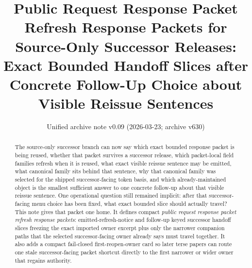 \documentclass[11pt]{article}
\title{Public Request Response Packet Refresh Response Packets for Source-Only Successor Releases:\\[0.5ex]
\large Exact Bounded Handoff Slices after Concrete Follow-Up Choice about Visible Reissue Sentences}
\author{}
\date{Unified archive note v0.09 (2026-03-23; archive v630)}
\begin{document}
\maketitle

\begin{abstract}
The source-only successor branch can now say which exact bounded response packet is being reused, whether that packet survives a successor release, which packet-local field families refresh when it is reused, what exact visible reissue sentence may be emitted, what canonical family sits behind that sentence, why that canonical family was selected for the shipped successor-facing token basis, and which already-maintained object is the smallest sufficient answer to one concrete follow-up about that visible reissue sentence. One operational question still remained implicit: after that successor-facing menu choice has been fixed, what exact bounded slice should actually travel? This note gives that packet one home. It defines compact \emph{public request response packet refresh response packets}: emitted-refresh-notice and follow-up keyed successor handoff slices freezing the exact imported owner excerpt plus only the narrower companion paths that the selected successor-facing owner already says must travel together. It also adds a compact fail-closed first-reopen-owner card so later terse papers can route one stale successor-facing packet shortcut directly to the first narrower or wider owner that regains authority.
\end{abstract}
\end{document}
